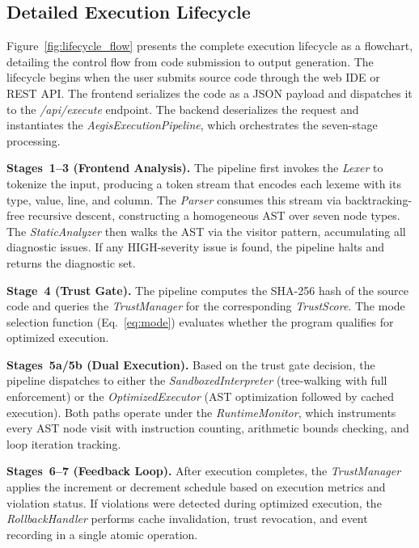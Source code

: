 \documentclass[conference]{IEEEtran}
\begin{document}
\subsection{Detailed Execution Lifecycle}

Figure~\ref{fig:lifecycle_flow} presents the complete execution
lifecycle as a flowchart, detailing the control flow from code
submission to output generation. The lifecycle begins when the
user submits source code through the web IDE or REST API. The
frontend serializes the code as a JSON payload and dispatches it
to the \textit{/api/execute} endpoint. The backend deserializes
the request and instantiates the
\textit{AegisExecutionPipeline}, which orchestrates the
seven-stage processing.

\textbf{Stages~1--3 (Frontend Analysis).} The pipeline first
invokes the \textit{Lexer} to tokenize the input, producing a
token stream that encodes each lexeme with its type, value,
line, and column. The \textit{Parser} consumes this stream via
backtracking-free recursive descent, constructing a homogeneous
AST over seven node types. The \textit{StaticAnalyzer} then
walks the AST via the visitor pattern, accumulating all
diagnostic issues. If any HIGH-severity issue is found, the
pipeline halts and returns the diagnostic set.

\textbf{Stage~4 (Trust Gate).} The pipeline computes the
SHA-256 hash of the source code and queries the
\textit{TrustManager} for the corresponding
\textit{TrustScore}. The mode selection function
(Eq.~\ref{eq:mode}) evaluates whether the program qualifies
for optimized execution.

\textbf{Stages~5a/5b (Dual Execution).} Based on the trust
gate decision, the pipeline dispatches to either the
\textit{SandboxedInterpreter} (tree-walking with full
enforcement) or the \textit{OptimizedExecutor} (AST
optimization followed by cached execution). Both paths
operate under the \textit{RuntimeMonitor}, which instruments
every AST node visit with instruction counting, arithmetic
bounds checking, and loop iteration tracking.

\textbf{Stages~6--7 (Feedback Loop).} After execution completes,
the \textit{TrustManager} applies the increment or decrement
schedule based on execution metrics and violation status. If
violations were detected during optimized execution, the
\textit{RollbackHandler} performs cache invalidation, trust
revocation, and event recording in a single atomic operation.
\end{document}
